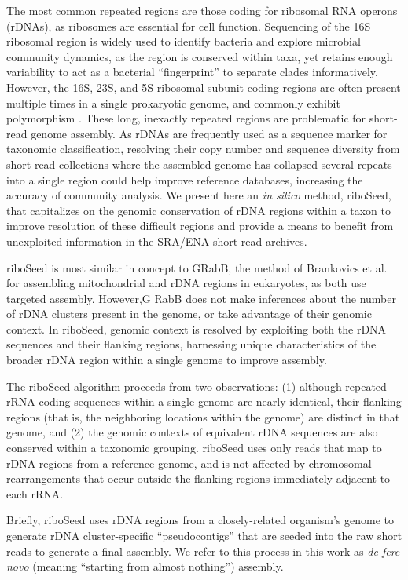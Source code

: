 \documentclass[10pt]{article}
\begin{document}
\begin{linenumbers}
The most common repeated regions are those coding for ribosomal RNA operons (rDNAs), as ribosomes are essential for cell function. Sequencing of the 16S ribosomal region is widely used to identify bacteria and explore microbial community dynamics\cite{Weisburg1991,Clarridge2004,Woese1990,Case2007}, as the region is conserved within taxa, yet retains enough variability to act as a bacterial ``fingerprint'' to separate clades informatively. However, the 16S, 23S, and 5S ribosomal subunit coding regions are often present multiple times in a single prokaryotic genome, and commonly exhibit polymorphism \cite{Coenye2003,Moreno2002,Lukjancenko2010,Vetrovsky2013}. These long, inexactly repeated regions\cite{Alkan2011} are problematic for short-read genome assembly. As rDNAs are frequently used as a sequence marker for taxonomic classification, resolving their copy number and sequence diversity from short read collections where the assembled genome has collapsed several repeats into a single region could help improve reference databases, increasing the accuracy of community analysis. We present here an \textit{in silico} method, riboSeed, that capitalizes on the genomic conservation of rDNA regions within a taxon to improve resolution of these difficult regions and provide a means to benefit from unexploited information in the SRA/ENA short read archives.


riboSeed is most similar in concept to GRabB, the method of Brankovics et al. \cite{Brankovics2016} for assembling mitochondrial and rDNA regions in eukaryotes, as both use targeted assembly. However,G RabB does not make inferences about the number of rDNA clusters present in the genome, or take advantage of their genomic context. In riboSeed, genomic context is resolved by exploiting both the rDNA sequences and their flanking regions, harnessing unique characteristics of the broader rDNA region within a single genome to improve assembly.


The riboSeed algorithm proceeds from two observations: (1) although repeated rRNA coding sequences within a single genome are nearly identical, their flanking regions (that is, the neighboring locations within the genome) are distinct in that genome, and (2) the genomic contexts of equivalent rDNA sequences are also conserved within a taxonomic grouping. riboSeed uses only reads that map to rDNA regions from a reference genome, and is not affected by chromosomal rearrangements that occur outside the flanking regions immediately adjacent to each rRNA.


Briefly, riboSeed uses rDNA regions from a closely-related organism's genome to generate rDNA cluster-specific ``pseudocontigs'' that are seeded into the raw short reads to generate a final assembly. We refer to this process in this work as \textit{de fere novo} (meaning ``starting from almost nothing'') assembly.



\end{linenumbers}
\end{document}
